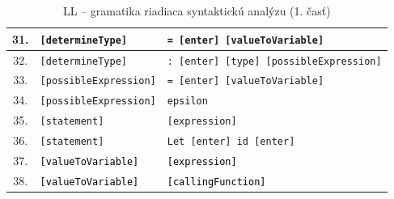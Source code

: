 \documentclass[a4paper, 11pt]{article}
\newcommand{\coloredtext}[1]{\textcolor{green!70!black}{#1}}
\newcommand{\highlight}[1]{\colorbox{red!20}{\textcolor{black}{#1}}}
\begin{document}
\begin{table}[!ht]
\begin{tabular}{|c|p{}|p{11cm}|}
        31. & \texttt{[determineType]} & \texttt{\coloredtext{=} [enter] [valueToVariable]} \\
        \hline
        32. & \texttt{[determineType]} & \texttt{\coloredtext{:} [enter] [type] [possibleExpression]} \\
        \hline
        33. & \texttt{[possibleExpression]} & \texttt{\coloredtext{=} [enter] [valueToVariable]} \\
        \hline
        34. & \texttt{[possibleExpression]} & \texttt{\coloredtext{epsilon}} \\
        \hline
        35. & \texttt{[statement]} & \texttt{[expression]} \\
        \hline
        36. & \texttt{[statement]} & \texttt{\coloredtext{Let} [enter] \coloredtext{id} [enter]} \\
        \hline
        37. & \texttt{\highlight{[valueToVariable]}} & \texttt{\highlight{[expression]}} \\
        \hline
        38. & \texttt{\highlight{[valueToVariable]}} & \texttt{\highlight{[callingFunction]}} \\
        \hline
        
      \end{tabular}
      \caption{LL -- gramatika riadiaca syntaktickú analýzu (1. časť)}
      \label{tab:LL_gram}
    \end{table}
\end{document}
